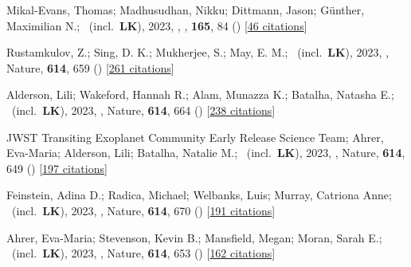 \item[{\color{numcolor}\scriptsize85}] Mikal-Evans, Thomas; Madhusudhan, Nikku; Dittmann, Jason; G{\"u}nther, Maximilian N.; \etal\ (incl.\ \textbf{LK}), 2023, , \aj, \textbf{165}, 84 () [\href{https://ui.adsabs.harvard.edu/abs/2023AJ....165...84M}{46 citations}]

\item[{\color{numcolor}\scriptsize84}] Rustamkulov, Z.; Sing, D. K.; Mukherjee, S.; May, E. M.; \etal\ (incl.\ \textbf{LK}), 2023, , Nature, \textbf{614}, 659 () [\href{https://ui.adsabs.harvard.edu/abs/2023Natur.614..659R}{261 citations}]

\item[{\color{numcolor}\scriptsize83}] Alderson, Lili; Wakeford, Hannah R.; Alam, Munazza K.; Batalha, Natasha E.; \etal\ (incl.\ \textbf{LK}), 2023, , Nature, \textbf{614}, 664 () [\href{https://ui.adsabs.harvard.edu/abs/2023Natur.614..664A}{238 citations}]

\item[{\color{numcolor}\scriptsize82}] JWST Transiting Exoplanet Community Early Release Science Team; Ahrer, Eva-Maria; Alderson, Lili; Batalha, Natalie M.; \etal\ (incl.\ \textbf{LK}), 2023, , Nature, \textbf{614}, 649 () [\href{https://ui.adsabs.harvard.edu/abs/2023Natur.614..649J}{197 citations}]

\item[{\color{numcolor}\scriptsize81}] Feinstein, Adina D.; Radica, Michael; Welbanks, Luis; Murray, Catriona Anne; \etal\ (incl.\ \textbf{LK}), 2023, , Nature, \textbf{614}, 670 () [\href{https://ui.adsabs.harvard.edu/abs/2023Natur.614..670F}{191 citations}]

\item[{\color{numcolor}\scriptsize80}] Ahrer, Eva-Maria; Stevenson, Kevin B.; Mansfield, Megan; Moran, Sarah E.; \etal\ (incl.\ \textbf{LK}), 2023, , Nature, \textbf{614}, 653 () [\href{https://ui.adsabs.harvard.edu/abs/2023Natur.614..653A}{162 citations}]

